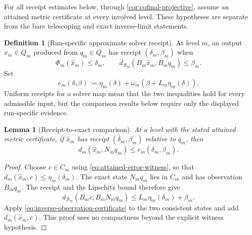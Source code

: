\documentclass[11pt]{article}
\newtheorem{lemma}[theorem]{Lemma}
\theoremstyle{definition}
\newtheorem{definition}[theorem]{Definition}
\theoremstyle{remark}
\numberwithin{equation}{section}
\newcommand{\cB}{\mathcal B}
\begin{document}
For all receipt estimates below, through
\cref{cor:cofinal-projective}, assume an attained metric certificate at
every involved level. These hypotheses are separate from the bare
telescoping and exact inverse-limit statements.

\begin{definition}[Run-specific approximate solver receipt]
At level $m$, an output $\widehat x_m\in Q_m$ produced from
$q_m\in Q_m$ has receipt $(\delta_m,\beta_m)$ when
\[
 \Phi_m(\widehat x_m)\le\delta_m,
 \qquad
 d_{\cB_m}(B_m\widehat x_m,B_mq_m)\le\beta_m.
\]
Set
\[
 e_m(\delta,\beta)
 :=
 \eta_m(\delta)+
 \omega_m\!\left(\beta+L_m\eta_m(\delta)\right).
\]
Uniform receipts for a solver map mean that the two inequalities hold for
every admissible input, but the comparison results below require only the
displayed run-specific evidence.
\end{definition}

\begin{lemma}[Receipt-to-exact comparison]\label{lem:receipt-to-exact}
At a level with the stated attained metric certificate, if
$\widehat x_m$ has receipt $(\delta_m,\beta_m)$ relative to $q_m$, then
\begin{equation}\label{eq:receipt-to-exact}
 d_m(\widehat x_m,N_mq_m)
 \le e_m(\delta_m,\beta_m).
\end{equation}
\end{lemma}

\begin{proof}
Choose $c\in C_m$ using \eqref{eq:attained-error-witness}, so that
$d_m(\widehat x_m,c)\le\eta_m(\delta_m)$. The exact state $N_mq_m$ lies
in $C_m$ and has observation $B_mq_m$. The receipt and the Lipschitz bound
therefore give
\[
 d_{\cB_m}(B_mc,B_mN_mq_m)
 \le L_m\eta_m(\delta_m)+\beta_m.
\]
Apply \eqref{eq:inverse-observation-certificate} to the two consistent
states and add $d_m(\widehat x_m,c)$. This proof uses no compactness beyond
the explicit witness hypothesis.
\end{proof}
\end{document}
